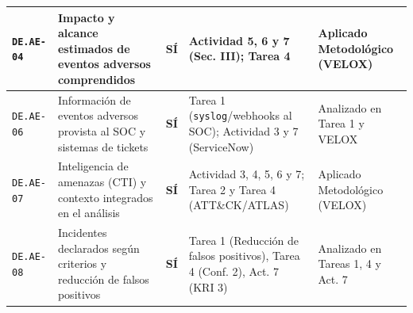\documentclass[letterpaper,11pt]{article}
\begin{document}
\begin{longtable}{|C{1.4cm}|L{5.4cm}|C{1.3cm}|L{4.3cm}|C{4.2cm}|}
\hline
\texttt{DE.AE-04} & Impacto y alcance estimados de eventos adversos comprendidos & \textbf{SÍ} & Actividad 5, 6 y 7 (Sec. III); Tarea 4 & Aplicado Metodológico (VELOX) \\
\hline
\texttt{DE.AE-06} & Información de eventos adversos provista al SOC y sistemas de tickets & \textbf{SÍ} & Tarea 1 (\texttt{syslog}/webhooks al SOC); Actividad 3 y 7 (ServiceNow) & Analizado en Tarea 1 y VELOX \\
\hline
\texttt{DE.AE-07} & Inteligencia de amenazas (CTI) y contexto integrados en el análisis & \textbf{SÍ} & Actividad 3, 4, 5, 6 y 7; Tarea 2 y Tarea 4 (ATT\&CK/ATLAS) & Aplicado Metodológico (VELOX) \\
\hline
\texttt{DE.AE-08} & Incidentes declarados según criterios y reducción de falsos positivos & \textbf{SÍ} & Tarea 1 (Reducción de falsos positivos), Tarea 4 (Conf. 2), Act. 7 (KRI 3) & Analizado en Tareas 1, 4 y Act. 7 \\
\hline


\end{longtable}
\end{document}

